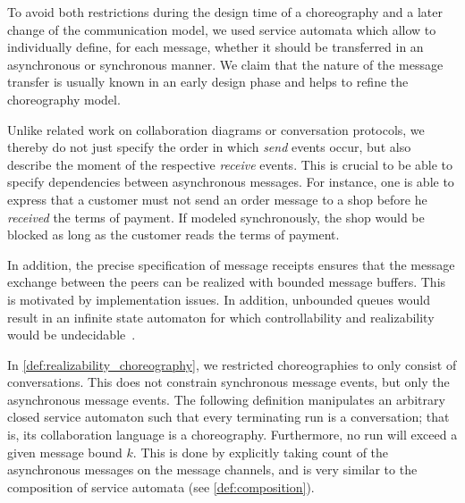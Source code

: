 To avoid both restrictions during the design time of a choreography and a later change of the communication model, we used service automata which allow to individually define, for each message, whether it should be transferred in an asynchronous or synchronous manner. We claim that the nature of the message transfer is usually known in an early design phase and helps to refine the choreography model. 

Unlike related work on collaboration diagrams or conversation protocols, we thereby do not just specify the order in which \emph{send} events occur, but also describe the moment of the respective \emph{receive} events. This is crucial to be able to specify dependencies between asynchronous messages. For instance, one is able to express that a customer must not send an order message to a shop before he \emph{received} the terms of payment. If modeled synchronously, the shop would be blocked as long as the customer reads the terms of payment.

In addition, the precise specification of message receipts ensures that the message exchange between the peers can be realized with bounded message buffers. This is  motivated by implementation issues. In addition, unbounded queues would result in an infinite state automaton for which controllability and realizability would be undecidable~\cite{MassutheSSW_2008_ipl}.

In \autoref{def:realizability_choreography}, we restricted choreographies to only consist of conversations. This does not constrain synchronous message events, but only the asynchronous message events. The following definition manipulates an arbitrary closed service automaton such that every terminating run is a conversation; that is, its collaboration language is a choreography. Furthermore, no run will exceed a given message bound $k$. This is done by explicitly taking count of the asynchronous messages on the message channels, and is very similar to the composition of service automata (see \autoref{def:composition}).

